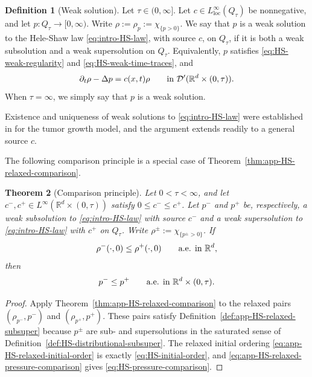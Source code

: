 \documentclass[11pt]{amsart}
\numberwithin{equation}{section}
\numberwithin{figure}{section}
\theoremstyle{plain}
\newtheorem{thm}{Theorem}[section]
\theoremstyle{definition}
\newtheorem{defn}[thm]{Definition}
\theoremstyle{remark}
\theoremstyle{plain}
\def\R{\mathbb{R}}
\begin{document}
\begin{defn}[Weak solution]\label{def:HS-weak-solution}
Let \(\tau\in(0,\infty]\).  Let \(c\in L^\infty_{\operatorname{loc}}(Q_\tau)\)
be nonnegative, and let \(p:Q_\tau\to[0,\infty)\).  Write
\(\rho:=\rho_p:=\chi_{\{p>0\}}\).  We say that \(p\) is a weak
solution to the Hele-Shaw law \eqref{eq:intro-HS-law}, with source \(c\), on
\(Q_\tau\), if it is both a weak subsolution and a weak supersolution on
\(Q_\tau\). Equivalently, \(p\) satisfies
\eqref{eq:HS-weak-regularity} and \eqref{eq:HS-weak-time-traces}, and
\begin{equation}\label{eq:HS-weak-equation}
    \partial_t\rho-\Delta p=c(x,t)\rho
    \qquad\hbox{in }\mathcal D'(\R^d\times(0,\tau)).
\end{equation}
When \(\tau=\infty\), we simply say that \(p\) is a weak solution.
\end{defn}

Existence and uniqueness of weak solutions to \eqref{eq:intro-HS-law} were established in \cite{PQV14} for the tumor growth model, and the argument extends readily to a general source $c$.


The following comparison
principle is a special case of
Theorem~\ref{thm:app-HS-relaxed-comparison}.
\begin{thm}[Comparison principle]\label{thm:HS-distributional-comparison}
Let \(0<\tau<\infty\), and let
\(c^-,c^+\in L^\infty(\R^d\times(0,\tau))\) satisfy
\(0\leq c^-\leq c^+\).  Let \(p^-\) and \(p^+\) be, respectively, a
weak subsolution to \eqref{eq:intro-HS-law} with source \(c^-\)
and a weak supersolution to \eqref{eq:intro-HS-law} with
\(c^+\) on \(Q_\tau\).  Write
\(\rho^\pm:=\chi_{\{p^\pm>0\}}\). If
\begin{equation}\label{eq:HS-initial-order}
    \rho^-(\cdot,0)\leq\rho^+(\cdot,0)
    \qquad\hbox{a.e. in }\R^d,
\end{equation}
then
\begin{equation}\label{eq:HS-pressure-comparison}
    p^-\leq p^+
    \qquad\hbox{a.e. in }\R^d\times(0,\tau).
\end{equation}

\end{thm}

\begin{proof}
Apply Theorem~\ref{thm:app-HS-relaxed-comparison} to the relaxed pairs
\((\rho_{p^-},p^-)\) and \((\rho_{p^+},p^+)\).  These pairs
satisfy Definition~\ref{def:app-HS-relaxed-subsuper} because \(p^\pm\) are
sub- and supersolutions in the saturated sense of
Definition~\ref{def:HS-distributional-subsuper}.  The relaxed initial ordering
\eqref{eq:app-HS-relaxed-initial-order} is exactly
\eqref{eq:HS-initial-order}, and
\eqref{eq:app-HS-relaxed-pressure-comparison} gives
\eqref{eq:HS-pressure-comparison}.
\end{proof}
\end{document}
